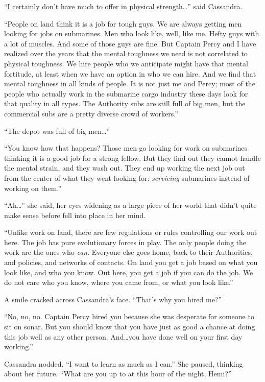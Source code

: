 \documentclass[
]{scrbook}
\begin{document}
``I certainly don't have much to offer in physical strength\ldots{}''
said Cassandra.

``People on land think it is a job for tough guys. We are always getting
men looking for jobs on submarines. Men who look like, well, like me.
Hefty guys with a lot of muscles. And some of those guys are fine. But
Captain Percy and I have realized over the years that the mental
toughness we need is not correlated to physical toughness. We hire
people who we anticipate might have that mental fortitude, at least when
we have an option in who we can hire. And we find that mental toughness
in all kinds of people. It is not just me and Percy; most of the people
who actually work in the submarine cargo industry these days look for
that quality in all types. The Authority subs are still full of big men,
but the commercial subs are a pretty diverse crowd of workers.''

``The depot was full of big men\ldots{}''

``You know how that happens? Those men go looking for work on submarines
thinking it is a good job for a strong fellow. But they find out they
cannot handle the mental strain, and they wash out. They end up working
the next job out from the center of what they went looking for:
\emph{servicing} submarines instead of working on them.''

``Ah\ldots{}'' she said, her eyes widening as a large piece of her world
that didn't quite make sense before fell into place in her mind.

``Unlike work on land, there are few regulations or rules controlling
our work out here. The job has pure evolutionary forces in play. The
only people doing the work are the ones who \emph{can}. Everyone else
goes home, back to their Authorities, and policies, and networks of
contacts. On land you get a job based on what you look like, and who you
know. Out here, you get a job if you can do the job. We do not care who
you know, where you came from, or what you look like.''

A smile cracked across Cassandra's face. ``That's why you hired me?''

``No, no, no. Captain Percy hired you because she was desperate for
someone to sit on sonar. But you should know that you have just as good
a chance at doing this job well as any other person. And\ldots you have
done well on your first day working.''

Cassandra nodded. ``I want to learn as much as I can.'' She paused,
thinking about her future. ``What are you up to at this hour of the
night, Hemi?''
\end{document}
